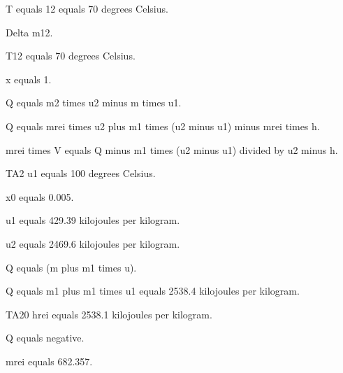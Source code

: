 T equals 12 equals 70 degrees Celsius.

Delta m12.

T12 equals 70 degrees Celsius.

x equals 1.

Q equals m2 times u2 minus m times u1.

Q equals mrei times u2 plus m1 times (u2 minus u1) minus mrei times h.

mrei times V equals Q minus m1 times (u2 minus u1) divided by u2 minus h.

TA2 u1 equals 100 degrees Celsius.

x0 equals 0.005.

u1 equals 429.39 kilojoules per kilogram.

u2 equals 2469.6 kilojoules per kilogram.

Q equals (m plus m1 times u).

Q equals m1 plus m1 times u1 equals 2538.4 kilojoules per kilogram.

TA20 hrei equals 2538.1 kilojoules per kilogram.

Q equals negative.

mrei equals 682.357.